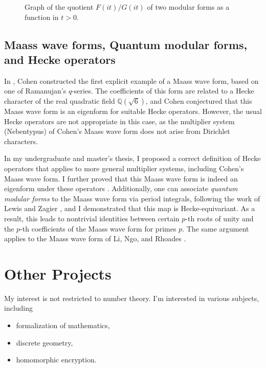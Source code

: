 \documentclass[12pt]{article}
\begin{document}
\begin{figure}[h]
    \centering
    
    \caption{Graph of the quotient $F(it)/G(it)$ of two modular forms as a function in $t > 0$.}
    \label{fig:d8graph}
\end{figure}
\subsection*{Maass wave forms, Quantum modular forms, and Hecke operators}


In \cite{cohen1988q}, Cohen constructed the first explicit example of a Maass wave form, based on one of Ramanujan's $q$-series. The coefficients of this form are related to a Hecke character of the real quadratic field $\mathbb{Q}(\sqrt{6})$, and Cohen conjectured that this Maass wave form is an eigenform for suitable Hecke operators. However, the usual Hecke operators are not appropriate in this case, as the multiplier system (Nebentypus) of Cohen's Maass wave form does not arise from Dirichlet characters.

In my undergraduate and master's thesis, I proposed a correct definition of Hecke operators that applies to more general multiplier systems, including Cohen's Maass wave form. I further proved that this Maass wave form is indeed an eigenform under these operators \cite{lee2018quantum,lee2019maass}. Additionally, one can associate \emph{quantum modular forms} to the Maass wave form via period integrals, following the work of Lewis and Zagier \cite{lewis2001period,zagier2010quantum}, and I demonstrated that this map is Hecke-equivariant. As a result, this leads to nontrivial identities between certain $p$-th roots of unity and the $p$-th coefficients of the Maass wave form for primes $p$. The same argument applies to the Maass wave form of Li, Ngo, and Rhoades \cite{li2013renormalization}.

\section*{Other Projects}

My interest is not restricted to number theory. I'm interested in various subjects, including
\begin{itemize}
    \item formalization of mathematics,
    \item discrete geometry,
    \item homomorphic encryption.
\end{itemize}
\end{document}
